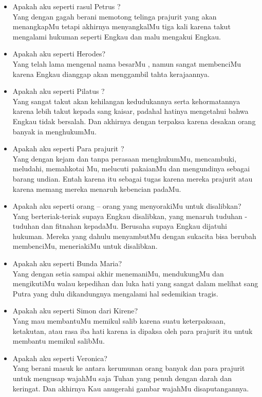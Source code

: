 \documentclass[a5paper,headsepline,titlepage,11pt,nnormalheadings,DIVcalc]{scrbook}
\newcommand{\BPP}[1]{\begin{itemize} \item[Bpk:] #1 \end{itemize}}
\newcommand{\BPW}[1]{\begin{itemize} \item[Ibu:] #1 \end{itemize}}
\begin{document}
\BPP{Apakah aku seperti rasul Petrus ?\\
Yang dengan gagah berani memotong telinga prajurit yang akan menangkapMu
tetapi akhirnya menyangkalMu tiga kali karena takut mengalami hukuman
seperti Engkau dan malu mengakui Engkau.}

\BPW{Apakah aku seperti Herodes?\\
Yang telah lama mengenal nama besarMu , namun sangat membenciMu karena
Engkau dianggap akan menggambil tahta kerajaannya.}

\BPP{Apakah aku seperti Pilatus ?\\
Yang sangat takut akan kehilangan kedudukannya serta kehormatannya karena
lebih takut kepada sang kaisar, padahal hatinya mengetahui bahwa Engkau
tidak bersalah. Dan akhirnya dengan terpaksa karena desakan orang banyak ia
menghukumMu.}

\BPW{Apakah aku seperti Para prajurit ?\\
Yang dengan kejam dan tanpa perasaan menghukumMu, mencambuki, meludahi,
memahkotai Mu, melucuti pakaianMu dan mengundinya sebagai barang undian.
Entah karena itu sebagai tugas karena mereka prajurit atau karena memang
mereka menaruh kebencian padaMu.}

\BPP{Apakah aku seperti orang – orang yang menyorakiMu untuk disalibkan?\\
Yang berteriak-teriak supaya Engkau disalibkan, yang menaruh tuduhan -
tuduhan dan fitnahan kepadaMu. Berusaha supaya Engkau dijatuhi hukuman.
Mereka yang dahulu menyambutMu dengan sukacita bisa berubah membenciMu,
meneriakiMu untuk disalibkan.}

\BPW{Apakah aku seperti Bunda Maria?\\
Yang dengan setia sampai akhir menemaniMu, mendukungMu dan mengikutiMu
walau kepedihan dan luka hati yang sangat dalam melihat sang Putra yang
dulu dikandungnya mengalami hal sedemikian tragis.}

\BPP{Apakah aku seperti Simon dari Kirene?\\
Yang mau membantuMu memikul salib karena suatu keterpaksaan, ketakutan,
atau rasa iba hati karena ia dipaksa oleh para prajurit itu untuk membantu
memikul salibMu.}

\BPW{Apakah aku seperti Veronica?\\
Yang berani masuk ke antara kerumunan orang banyak dan para prajurit untuk
mengusap wajahMu saja Tuhan yang penuh dengan darah dan keringat. Dan
akhirnya Kau anugerahi gambar wajahMu disaputangannya.}
\end{document}
